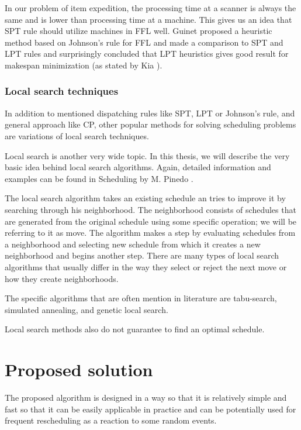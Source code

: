 \documentclass{ctuthesis}
\begin{document}
In our problem of item expedition, the processing time at a scanner is always the same and is lower than processing time at a machine. This gives us an idea that SPT rule should utilize machines in FFL well. Guinet \cite{guinet} proposed a heuristic method based on Johnson's rule for FFL and made a comparison to SPT and LPT rules and surprisingly concluded that LPT heuristics gives good result for makespan minimization (as stated by Kia \cite{kia}).

\subsection{Local search techniques}

In addition to mentioned dispatching rules like SPT, LPT or Johnson's rule, and general approach like CP, other popular methods for solving scheduling problems are variations of local search techniques.

Local search is another very wide topic. In this thesis, we will describe the very basic idea behind local search algorithms. Again, detailed information and examples can be found in Scheduling by M. Pinedo \cite{pinedo}. 

The local search algorithm takes an existing schedule an tries to improve it by searching through his neighborhood. The neighborhood consists of schedules that are generated from the original schedule using some specific operation; we will be referring to it as move. The algorithm makes a step by evaluating schedules from a neighborhood and selecting new schedule from which it creates a new neighborhood and begins another step. There are many types of local search algorithms that usually differ in the way they select or reject the next move or how they create neighborhoods. 

The specific algorithms that are often mention in literature are tabu-search, simulated annealing, and genetic local search.

Local search methods also do not guarantee to find an optimal schedule.

\chapter{Proposed solution}
\label{ch:Proposed solution}

The proposed algorithm is designed in a way so that it is relatively simple and fast so that it can be easily applicable in practice and can be potentially used for frequent rescheduling as a reaction to some random events.
\end{document}
